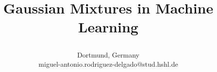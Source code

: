 \documentclass[conference]{IEEEtran}
\begin{document}
\title{Gaussian Mixtures in Machine Learning\\


\author{
Dortmund, Germany \\
miguel-antonio.rodriguez-delgado@stud.hshl.de}
}

\maketitle
\end{document}

